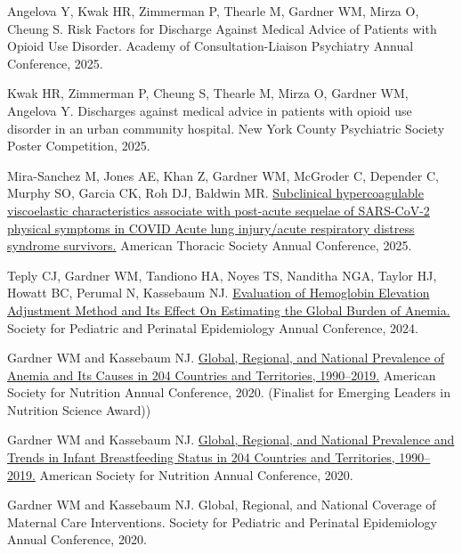 \documentclass[11pt,article,oneside]{memoir}
\begin{document}
\bigskip

\medskip

\begin{publist}

\item Angelova Y, Kwak HR, Zimmerman P, Thearle M, {\minbold Gardner WM}, Mirza O, Cheung S. Risk Factors for Discharge Against Medical Advice of Patients with Opioid Use Disorder. 
Academy of Consultation-Liaison Psychiatry Annual Conference, 2025.

\item Kwak HR, Zimmerman P, Cheung S, Thearle M, Mirza O, {\minbold Gardner WM}, Angelova Y. Discharges against medical advice in patients with opioid use disorder in an urban community hospital. 
New York County Psychiatric Society Poster Competition, 2025.

\item Mira-Sanchez M, Jones AE, Khan Z, {\minbold Gardner WM}, McGroder C, Depender C, Murphy SO, Garcia CK, Roh DJ, Baldwin MR. \href{https://www.atsjournals.org/doi/abs/10.1164/ajrccm.2025.211.Abstracts.A3694}{Subclinical 
hypercoagulable viscoelastic characteristics associate with post-acute sequelae of SARS-CoV-2 physical symptoms in COVID Acute lung injury/acute respiratory distress syndrome survivors.} American Thoracic Society Annual Conference, 2025. 

\item Teply CJ, {\minbold Gardner WM}, Tandiono HA, Noyes TS, Nanditha NGA, Taylor HJ, Howatt BC, Perumal N, Kassebaum NJ. \href{https://sper.org/wp-content/uploads/2024/06/2024-Abstract-Book-FINAL.pdf}{Evaluation of Hemoglobin Elevation Adjustment Method and 
Its Effect On Estimating the Global Burden of Anemia.} Society for Pediatric and Perinatal Epidemiology Annual Conference, 2024. 

\item {\minbold Gardner WM} and Kassebaum NJ. \href{https://doi.org/10.1093/cdn/nzaa053_035}{Global, Regional, and National Prevalence of Anemia and Its
Causes in 204 Countries and Territories, 1990--2019.} American Society for Nutrition Annual Conference, 2020. (Finalist for Emerging 
Leaders in Nutrition Science Award))

\item {\minbold Gardner WM} and Kassebaum NJ. \href{https://doi.org/10.1093/cdn/nzaa054_064}{Global, Regional, and National Prevalence and Trends in Infant Breastfeeding Status in 204 Countries and Territories, 1990--2019.} 
American Society for Nutrition Annual Conference, 2020.

\item {\minbold Gardner WM} and Kassebaum NJ. Global, Regional, and National Coverage of Maternal Care
Interventions. Society for Pediatric and Perinatal Epidemiology Annual Conference, 2020.

\end{publist}
\end{document}
